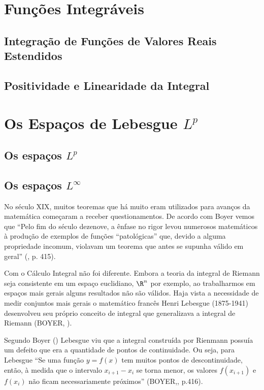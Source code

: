     \section{Funções Integráveis}
        \subsection{Integração de Funções de Valores Reais Estendidos}
        \subsection{Positividade e Linearidade da Integral}
    \section{Os Espaços de Lebesgue $L^p$}
        \subsection{Os espaços $L^p$}
        \subsection{Os espaços $L^\infty$}
    
    No século XIX, muitos teoremas que há muito eram utilizados para avanços da matemática começaram a receber questionamentos.
    De acordo com Boyer vemos que \enquote{Pelo fim do século dezenove, a ênfase no rigor levou numerosos matemáticos à produção de exemplos de funções “patológicas” que, devido a alguma propriedade incomum, violavam um teorema que antes se supunha válido em geral} (\citeyear{Boy}, p. 415).    
    
    Com o Cálculo Integral não foi diferente. 
    Embora a teoria da integral de Riemann seja consistente em um espaço euclidiano, $\R^n$ por exemplo, ao trabalharmos em espaços mais gerais alguns resultados não são válidos.
    Haja vista a necessidade de medir conjuntos mais gerais o matemático francês Henri Lebesgue (1875-1941) desenvolveu seu próprio conceito de integral que generalizava a integral de Riemann (BOYER, \citeyear{Boy}).

    Segundo Boyer (\citeyear{Boy}) Lebesgue viu que a integral construída por Rienmann possuía um defeito que era a quantidade de pontos de continuidade.
    Ou seja, para Lebesgue 
    \enquote{Se uma função $y = f(x)$ tem muitos pontos de descontinuidade, então, à medida que o intervalo $x_{i+1} - x_i$ se torna menor, os valores $f(x_{i+1})$ e $f(x_i)$ não ficam necessariamente próximos} (BOYER,\citeyear{Boy}, p.416).

